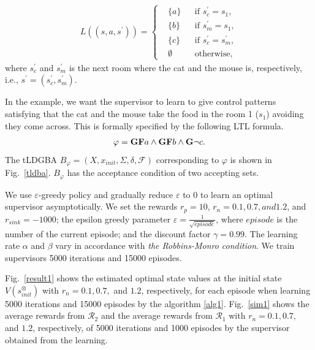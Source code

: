\documentclass[10 pt, dvipdfmx]{article}
\theoremstyle{definition}
\begin{document}
\begin{align}
   L((s, a, s^{\prime})) =
    \left\{
    \begin{aligned}
      & \{ a \} &  & \text{if }s_c^{\prime} = s_1, \nonumber \\
      & \{ b \} &  & \text{if }s_m^{\prime} = s_1, \nonumber \\
      & \{ c \} &  & \text{if }s_c^{\prime} = s_m^{\prime}, \nonumber \\
      & \emptyset &  & \text{otherwise},
    \end{aligned}
    \right.
\end{align}
where $s_c^{\prime}$ and $s_m^{\prime}$ is the next room where the cat and the mouse is, respectively, i.e., $s^{\prime} = (s_c^{\prime},s_m^{\prime})$.

In the example, we want the supervisor to learn to give control patterns satisfying that the cat and the mouse take the food in the room 1 ($s_1$) avoiding they come across. This is formally specified by the following LTL formula.
\begin{align*}
  \varphi = \text{{\bf GF}}a \wedge \text{{\bf GF}}b \wedge \text{{\bf G}}\neg c.
\end{align*}
The tLDGBA $B_{\varphi} = (X, x_{init},\Sigma,\delta,\mathcal{F})$ corresponding to $\varphi$ is shown in Fig.\ \ref{tldba}. $B_{\varphi}$ has the acceptance condition of two accepting sets.

We use $\varepsilon$-greedy policy and gradually reduce $\varepsilon$ to 0 to learn an optimal supervisor asymptotically.
We set the rewards $r_p = 10$, $r_{n} = 0.1, 0.7, and 1.2$, and $r_{sink} = -1000$; the epsilon greedy parameter $ \varepsilon = \frac{1}{ \sqrt{episode} }$, where $episode$ is the number of the current episode; and the discount factor $\gamma = 0.99$. %
The learning rate $\alpha$ and $\beta$ vary in accordance with {\it the Robbins-Monro condition}. We train supervisors 5000 iterations and 15000 episodes.

Fig.\ \ref{result1} shows the estimated optimal state values at the initial state $V(s^{\otimes}_{init})$ with $r_{n} = 0.1, 0.7,$ and $1.2$, respectively, for each episode when learning 5000 iterations and 15000 episodes by the algorithm \ref{alg1}.
Fig.\ \ref{sim1} shows the average rewards from $\mathcal{R}_2$ and the average rewards from $\mathcal{R}_1$ with $r_{n} = 0.1, 0.7,$ and $1.2$, respectively, of 5000 iterations and 1000 episodes by the supervisor obtained from the learning.
\end{document}
